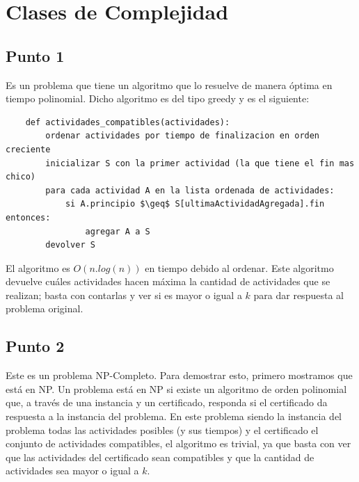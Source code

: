 \documentclass[a4paper,10pt]{article}
\begin{document}
\maketitle
\thispagestyle{empty}

\pagebreak 

\tableofcontents
\pagebreak

\clearpage
\section{Clases de Complejidad}

\subsection{Punto 1}
	Es un problema que tiene un algoritmo que lo resuelve de manera óptima en tiempo polinomial. Dicho algoritmo es del tipo greedy y es el siguiente:
	\begin{lstlisting}
	def actividades_compatibles(actividades):
	    ordenar actividades por tiempo de finalizacion en orden creciente
	    inicializar S con la primer actividad (la que tiene el fin mas chico)
	    para cada actividad A en la lista ordenada de actividades:
	        si A.principio $\geq$ S[ultimaActividadAgregada].fin entonces:
	            agregar A a S
	    devolver S
	\end{lstlisting}

	El algoritmo es $O(n.log(n))$ en tiempo debido al ordenar. Este algoritmo devuelve cuáles actividades hacen máxima la cantidad de actividades que se realizan; basta con contarlas y ver si es mayor o igual a $k$ para dar respuesta al problema original.

\subsection{Punto 2} \label{punto2}
	Este es un problema NP-Completo. Para demostrar esto, primero mostramos que está en NP. Un problema está en NP si existe un algoritmo de orden polinomial que, a través de una instancia y un certificado, responda si el certificado da respuesta a la instancia del problema. En este problema siendo la instancia del problema todas las actividades posibles (y sus tiempos) y el certificado el conjunto de actividades compatibles, el algoritmo es trivial, ya que basta con ver que las actividades del certificado sean compatibles y que la cantidad de actividades sea mayor o igual a $k$.
\end{document}
